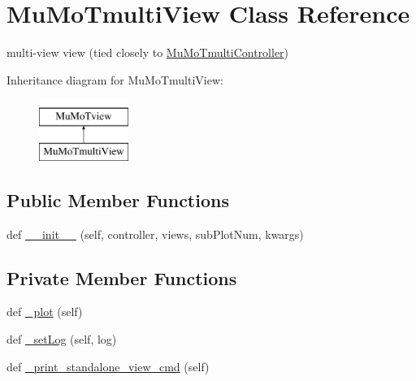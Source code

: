 \hypertarget{class_mu_mo_t_1_1_mu_mo_t_1_1_mu_mo_tmulti_view}{}\section{Mu\+Mo\+Tmulti\+View Class Reference}
\label{class_mu_mo_t_1_1_mu_mo_t_1_1_mu_mo_tmulti_view}


multi-\/view view (tied closely to \hyperlink{class_mu_mo_t_1_1_mu_mo_t_1_1_mu_mo_tmulti_controller}{Mu\+Mo\+Tmulti\+Controller})  


Inheritance diagram for Mu\+Mo\+Tmulti\+View\+:\begin{figure}[H]
\begin{center}
\leavevmode
\includegraphics[height=2.000000cm]{class_mu_mo_t_1_1_mu_mo_t_1_1_mu_mo_tmulti_view}
\end{center}
\end{figure}
\subsection*{Public Member Functions}
\begin{DoxyCompactItemize}
\item 
def \hyperlink{class_mu_mo_t_1_1_mu_mo_t_1_1_mu_mo_tmulti_view_aa355c85c06db29c1df7b6505493d5354}{\+\_\+\+\_\+init\+\_\+\+\_\+} (self, controller, views, sub\+Plot\+Num, kwargs)
\end{DoxyCompactItemize}
\subsection*{Private Member Functions}
\begin{DoxyCompactItemize}
\item 
def \hyperlink{class_mu_mo_t_1_1_mu_mo_t_1_1_mu_mo_tmulti_view_aaff21bb2a6ebdaed50f2f2fb67d0bf5c}{\+\_\+plot} (self)
\item 
def \hyperlink{class_mu_mo_t_1_1_mu_mo_t_1_1_mu_mo_tmulti_view_abfc1e19ed53c088799d1f499bc010f7f}{\+\_\+set\+Log} (self, log)
\item 
def \hyperlink{class_mu_mo_t_1_1_mu_mo_t_1_1_mu_mo_tmulti_view_a3af54c33f997937b14f422e772d5280a}{\+\_\+print\+\_\+standalone\+\_\+view\+\_\+cmd} (self)
\end{DoxyCompactItemize}
